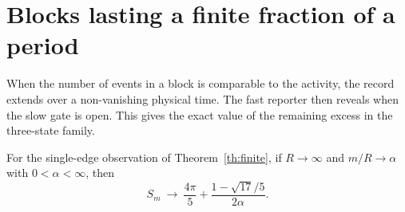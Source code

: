 \section{Blocks lasting a finite fraction of a period}\label{sec:macro}
When the number of events in a block is comparable to the activity, the record extends over a non-vanishing physical time. The fast reporter then reveals when the slow gate is open. This gives the exact value of the remaining excess in the three-state family.

\begin{theorem}\label{th:macro}
For the single-edge observation of Theorem~\ref{th:finite}, if $R\to\infty$ and $m/R\to\alpha$ with $0<\alpha<\infty$, then
\[
 S_m\ \longrightarrow\ \frac{4\pi}{5}+\frac{1-\sqrt{17}/5}{2\alpha}.
\]
\end{theorem}

